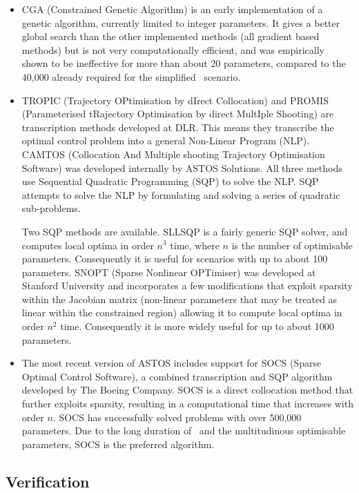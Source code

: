 \begin{itemize}
\item CGA (Constrained Genetic Algorithm) is an early implementation of a genetic algorithm, currently limited to integer parameters. It gives a better global search than the other implemented methods (all gradient based methods) but is not very computationally efficient, and was empirically shown to be ineffective for more than about 20 parameters, compared to the 40,000 already required for the simplified \BW\ scenario.
\item TROPIC (Trajectory OPtimisation by dIrect Collocation) and PROMIS (Parameterised tRajectory Optimisation by direct MultIple Shooting) are transcription methods developed at DLR. This means they transcribe the optimal control problem into a general Non-Linear Program (NLP). CAMTOS (Collocation And Multiple shooting Trajectory Optimisation Software) was developed internally by ASTOS Solutions. All three methods use Sequential Quadratic Programming (SQP) to solve the NLP. SQP attempts to solve the NLP by formulating and solving a series of quadratic sub-problems.

Two SQP methods are available. SLLSQP is a fairly generic SQP solver, and computes local optima in order $n^{3}$ time, where $n$ is the number of optimisable parameters. Consequently it is useful for scenarios with up to about 100 parameters. SNOPT (Sparse Nonlinear OPTimiser) was developed at Stanford University and incorporates a few modifications that exploit sparsity within the Jacobian matrix (non-linear parameters that may be treated as linear within the constrained region) allowing it to compute local optima in order $n^{2}$ time. Consequently it is more widely useful for up to about 1000 parameters.

\item The most recent version of ASTOS includes support for SOCS (Sparse Optimal Control Software), a combined transcription and SQP algorithm developed by The Boeing Company. SOCS is a direct collocation method that further exploits sparsity, resulting in a computational time that increases with order $n$. SOCS has successfully solved problems with over 500,000 parameters. Due to the long duration of \BW\ and the multitudinous optimisable parameters, SOCS is the preferred algorithm.
\end{itemize}

\subsection{Verification} \label{sub:ASTOS-Verification}

